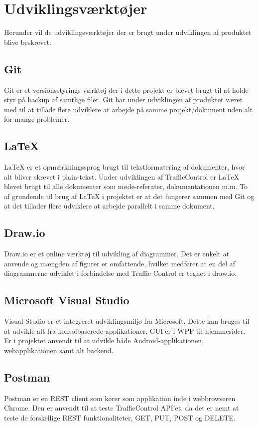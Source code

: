 \section{Udviklingsværktøjer}
	Herunder vil de udviklingsværktøjer der er brugt under udviklingen af 
	produktet blive beskrevet.
	
	\subsection*{Git}
	Git\cite{GitRef} er et versionsstyrings-værktøj der i dette projekt er 
	blevet brugt til at holde styr på backup af samtlige filer. Git har under 
	udviklingen af produktet været med til at tillade flere udviklere at 
	arbejde på samme projekt/dokument uden alt for mange problemer.
	
	\subsection*{\LaTeX}
	\LaTeX \cite{LatexRef} er et opmærkningssprog brugt til tekstformatering af 
	dokumenter, hvor alt bliver skrevet i plain-tekst. Under udviklingen af 
	TrafficControl er LaTeX blevet brugt til alle dokumenter som 
	møde-referater, dokumentationen m.m. To af grundende til brug af LaTeX i 
	projektet er at det fungerer sammen med Git og at det tillader flere 
	udviklere at arbejde parallelt i samme dokument.
	
	\subsection*{Draw.io}
	Draw.io\cite{Draw.io} er et online værktøj til udvikling af diagrammer. 
	Det er enkelt at anvende og mængden af figurer er omfattende, hvilket medfører at en del af diagrammerne udviklet i forbindelse med Traffic Control er tegnet i draw.io.
	
	\subsection*{Microsoft Visual Studio}
	Visual Studio\cite{VisualStudio} er et integreret udviklingsmiljø fra 
	Microsoft. Dette kan 	bruges til at udvikle alt fra konsolbaserede 
	applikationer, GUI'er i WPF til hjemmesider. Er i projektet anvendt til at 
	udvikle både Android-applikationen, webapplikationen samt alt backend.
		
	\subsection*{Postman} 
	Postman\cite{Postman} er en REST client som kører som applikation inde i 
	webbrowseren Chrome. Den er anvendt til at teste TrafficControl API'et, da 
	det er nemt at teste de forskellige REST funktionaliteter, GET, PUT, POST og 
	DELETE.
	
